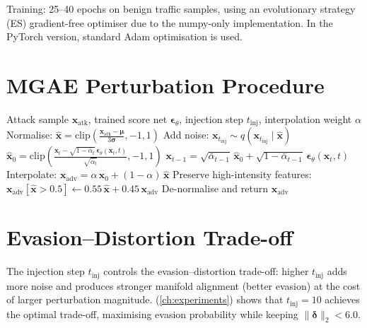 Training: 25--40 epochs on benign traffic samples, using an evolutionary
strategy (ES) gradient-free optimiser due to the numpy-only implementation.
In the PyTorch version, standard Adam optimisation is used.

\section{MGAE Perturbation Procedure}

\begin{algorithm}[H]
\caption{\mgae{} Perturbation}
\label{alg:mgae}
\begin{algorithmic}[1]
\Require Attack sample $\mathbf{x}_{\mathrm{atk}}$, trained score net
  $\boldsymbol\epsilon_\theta$, injection step $t_{\mathrm{inj}}$,
  interpolation weight $\alpha$
\State Normalise: $\hat{\mathbf{x}} = \mathrm{clip}
  \!\left(\frac{\mathbf{x}_{\mathrm{atk}} - \boldsymbol\mu}
  {3\boldsymbol\sigma}, -1, 1\right)$
\State Add noise: $\mathbf{x}_{t_{\mathrm{inj}}} \sim
  q(\mathbf{x}_{t_{\mathrm{inj}}} \mid \hat{\mathbf{x}})$
  \State $\hat{\mathbf{x}}_0 = \mathrm{clip}\!\left(
    \frac{\mathbf{x}_t - \sqrt{1-\bar\alpha_t}\,\boldsymbol\epsilon_\theta(\mathbf{x}_t,t)}
    {\sqrt{\bar\alpha_t}}, -1, 1\right)$
  \State $\mathbf{x}_{t-1} = \sqrt{\bar\alpha_{t-1}}\,\hat{\mathbf{x}}_0
    + \sqrt{1-\bar\alpha_{t-1}}\,\boldsymbol\epsilon_\theta(\mathbf{x}_t,t)$
\EndFor
\State Interpolate: $\mathbf{x}_{\mathrm{adv}} = \alpha\,\mathbf{x}_0
    + (1-\alpha)\,\hat{\mathbf{x}}$
\State Preserve high-intensity features:
  $\mathbf{x}_{\mathrm{adv}}[\hat{\mathbf{x}}>0.5]
    \leftarrow 0.55\,\hat{\mathbf{x}} + 0.45\,\mathbf{x}_{\mathrm{adv}}$
\State De-normalise and return $\mathbf{x}_{\mathrm{adv}}$
\end{algorithmic}
\end{algorithm}

\section{Evasion--Distortion Trade-off}

The injection step $t_{\mathrm{inj}}$ controls the evasion--distortion
trade-off: higher $t_{\mathrm{inj}}$ adds more noise and produces
stronger manifold alignment (better evasion) at the cost of larger
perturbation magnitude.  (\cref{ch:experiments})
shows that $t_{\mathrm{inj}} = 10$ achieves the optimal trade-off,
maximising evasion probability while keeping $\|\boldsymbol\delta\|_2 < 6.0$.
